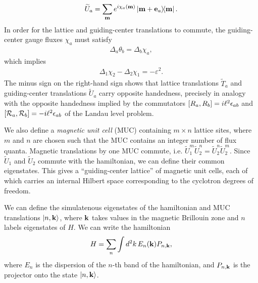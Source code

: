 \documentclass[aps,prb,twocolumn,letterpaper,twoside,nobalancelastpage,groupedaddress,amsmath,amssymb,floatfix,citeautoscript]{revtex4-1}
\begin{document}



\begin{align*}
\widetilde{U}_a = \sum_{\mathbf{m}} e^{i\chi_a(\mathbf{m})} \dyad{\bfm + \mathbf{e}_a}{\bfm}.
\end{align*}
In order for the lattice and guiding-center translations to commute, the guiding-center gauge fluxes $\chi_a$ must satisfy
\begin{align*}
\Delta_a \theta_b = \Delta_b\chi_a,
\end{align*}
which implies
\begin{align*}
\Delta_1\chi_2 - \Delta_2 \chi_1 = -\varepsilon^2.
\end{align*}
The minus sign on the right-hand sign shows that lattice translations $\widetilde{T}_a$ and guiding-center translations $\widetilde{U}_a$ carry opposite handedness, precisely in analogy with the opposite handedness implied by the commutators $\comm{R_a}{R_b} = i\ell^2 \epsilon_{ab}$ and $\comm{\mathcal{R}_a}{\mathcal{R}_b} = -i\ell^2 \epsilon_{ab}$ of the Landau level problem.

We also define a \textit{magnetic unit cell} (MUC) containing $m \times n$ lattice sites, where $m$ and $n$ are chosen such that the MUC contains an integer number of flux quanta. Magnetic translations by one MUC commute, i.e. $\widetilde{U}_1^{m}\widetilde{U}_2^{n} = \widetilde{U}_2^{n}\widetilde{U}_2^{m}$. Since $\widetilde{U}_1$ and $\widetilde{U}_2$ commute with the hamiltonian, we can define their common eigenstates. This gives a ``guiding-center lattice'' of magnetic unit cells, each of which carries an internal Hilbert space corresponding to the cyclotron degrees of freedom.

We can define the simulatenous eigenstates of the hamiltonian and MUC translations $\ket{n,{\bf k}}$, where ${\bf k}$ takes values in the magnetic Brillouin zone and $n$ labels eigenstates of $H$. We can write the hamiltonian 
\begin{align}
\label{band-projector-ham}
H = \sum_{n}\int d^2k\, E_{n}({\bf k}) P_{n,{\bf k}},
\end{align}
where $E_n$ is the dispersion of the $n$-th band of the hamiltonian, and $P_{n,{\bf k}}$ is the projector onto the state $\ket{n,{\bf k}}$.
\end{document}
